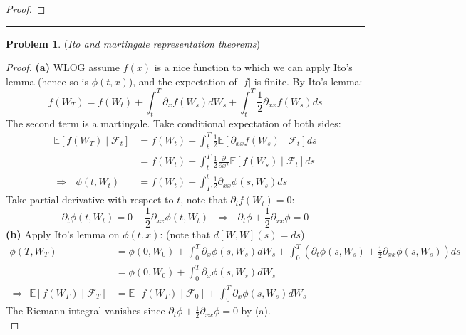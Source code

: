 \documentclass[a4paper, 10pt]{article}
\theoremstyle{definition}
\newtheorem{problem}{Problem}
\theoremstyle{hSol}
\begin{document}
\begin{proof}
\end{proof}

\noindent\rule{16cm}{0.4pt}
\begin{problem} (\textit{Ito and martingale representation theorems})
\end{problem}
\begin{proof} \textbf{(a)} WLOG assume $f(x)$ is a nice function to which we can apply Ito's lemma (hence so is $\phi(t,x)$), and the expectation of $|f|$ is finite. By Ito's lemma:
\begin{equation}
	f(W_T) = f(W_t) + \int_t^T \partial_x f(W_s) dW_s + \int_t^T \frac{1}{2}\partial_{xx}f(W_s)ds
\end{equation}
The second term is a martingale. Take conditional expectation of both sides:
\begin{equation}
	\begin{split}
		\mathbb{E}\left[f(W_T)\middle|\mathcal{F}_t\right] &= f(W_t) + \int_t^T \frac{1}{2}\mathbb{E}\left[\partial_{xx}f(W_s)\middle|\mathcal{F}_t\right]ds\\
		&= f(W_t) + \int_t^T \frac{1}{2}\frac{\partial }{\partial x^2}\mathbb{E}\left[f(W_s)\middle|\mathcal{F}_t\right]ds\\
		\Rightarrow~~~ \phi(t,W_t) &= f(W_t) - \int_T^t \frac{1}{2} \partial_{xx} \phi(s, W_s) ds
	\end{split}
\end{equation}
Take partial derivative with respect to $t$, note that $\partial_t f(W_t) = 0$:
\begin{equation}
	\partial_t \phi(t,W_t) = 0 -  \frac{1}{2} \partial_{xx} \phi(t, W_t)~~~\Rightarrow~~~\partial_t \phi+\frac{1}{2}\partial_{xx} \phi = 0
\end{equation}
\textbf{(b)} Apply Ito's lemma on $\phi(t,x)$: (note that $d[W,W](s)=ds$)
\begin{equation}
	\begin{split}
		\phi(T,W_T) &= \phi(0,W_0) + \int_0^T \partial_x\phi(s,W_s)dW_s + \int_0^T (\partial_t\phi(s, W_s) + \frac{1}{2}\partial_{xx}\phi(s, W_s))ds \\
		&= \phi(0,W_0) + \int_0^T \partial_x\phi(s,W_s)dW_s\\
		\Rightarrow~~\mathbb{E}\left[f(W_T)\middle|\mathcal{F}_T\right]& =\mathbb{E}\left[f(W_T)\middle|\mathcal{F}_0\right] + \int_0^T \partial_x\phi(s,W_s)dW_s
	\end{split}
\end{equation}
The Riemann integral vanishes since $\partial_t \phi+\frac{1}{2}\partial_{xx} \phi = 0$ by (a). \\

\end{proof}
\end{document}
